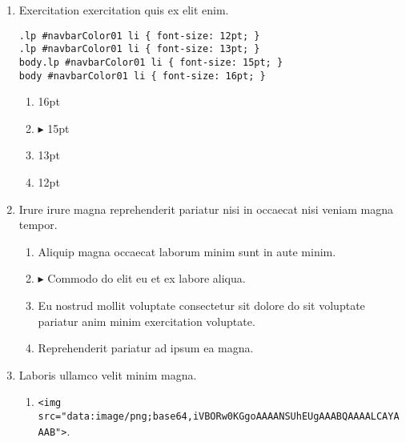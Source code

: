\documentclass[a4paper,12pt]{article}
\begin{document}
\begin{enumerate}[label=\textbf{\arabic*.}]
\item Exercitation exercitation quis ex elit enim.
  
  \begin{minipage}{\textwidth} %
  \begin{lstlisting}
.lp #navbarColor01 li { font-size: 12pt; }
.lp #navbarColor01 li { font-size: 13pt; }
body.lp #navbarColor01 li { font-size: 15pt; }
body #navbarColor01 li { font-size: 16pt; }
  \end{lstlisting}
  \end{minipage}
\begin{multicols}{2}
	\begin{enumerate}
		\item  16pt
  
		\item $\blacktriangleright$  15pt
    
		\item  13pt
    
		\item  12pt
    
	\end{enumerate}

\end{multicols}
\item Irure irure magna reprehenderit pariatur nisi in occaecat nisi veniam magna tempor.
\begin{multicols}{2}
	\begin{enumerate}
		\item  Aliquip magna occaecat laborum minim sunt in aute minim.
    
		\item $\blacktriangleright$  Commodo do elit eu et ex labore aliqua.
    
		\item  Eu nostrud mollit voluptate consectetur sit dolore do sit voluptate pariatur anim minim exercitation voluptate.
    
		\item  Reprehenderit pariatur ad ipsum ea magna.
  
	\end{enumerate}

\end{multicols}
\item Laboris ullamco velit minim magna.
	\begin{enumerate}
		\item  \texttt{<img src="{}data:image/png;base64,iVBORw0KGgoAAAANSUhEUgAAABQAAAALCAYAAAB"{}>}.
    

\end{enumerate}
\end{enumerate}
\end{document}
